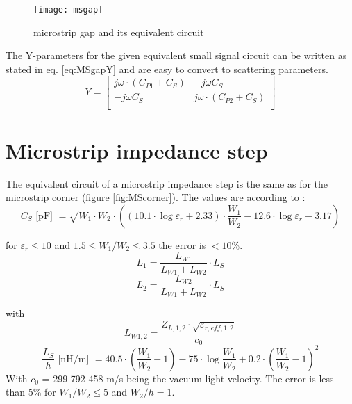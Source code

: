 \documentclass[10pt]{report}
\begin{document}
\begin{figure}[ht]
\begin{center}
\texttt{[image: msgap]}
\end{center}
\caption{microstrip gap and its equivalent circuit}
\label{fig:MSgap}
\end{figure}
\FloatBarrier

The Y-parameters for the given equivalent small signal circuit can be
written as stated in eq. \eqref{eq:MSgapY} and are easy to convert to
scattering parameters.
\begin{equation}
Y =
\begin{bmatrix}
j\omega\cdot \left(C_{P1} + C_S\right) & -j\omega C_S\\
-j\omega C_S & j\omega\cdot \left(C_{P2} + C_S\right)\\
\end{bmatrix}
\label{eq:MSgapY}
\end{equation}

\section{Microstrip impedance step}

The equivalent circuit of a microstrip impedance step is the same as
for the microstrip corner (figure \ref{fig:MScorner}).  The values are
according to \cite{Gupta}:
\begin{equation}
C_S \textrm{ [pF] } = \sqrt{W_1\cdot W_2}\cdot\left( (10.1\cdot\log{\varepsilon_r} + 2.33)\cdot
     \dfrac{W_1}{W_2} - 12.6\cdot\log{\varepsilon_r} - 3.17 \right)
\end{equation}

for $\varepsilon_r\le 10$ and $1.5\le W_1/W_2\le 3.5$ the error is
$<10$\%.
\begin{equation}
L_1 = \frac{L_{W1}}{L_{W1}+L_{W2}}\cdot L_S
\end{equation}
\begin{equation}
L_2 = \frac{L_{W2}}{L_{W1}+L_{W2}}\cdot L_S
\end{equation}

with
\begin{equation}
L_{W1,2} = \dfrac{Z_{L,1,2}\cdot\sqrt{\varepsilon_{r,eff,1,2}}}{c_0}
\end{equation}
\begin{equation}
\frac{L_S}{h} \textrm{ [nH/m] } = 40.5\cdot\left( \dfrac{W_1}{W_2}-1 \right)
      - 75\cdot\log{\dfrac{W_1}{W_2}} + 0.2\cdot \left( \dfrac{W_1}{W_2}-1 \right)^2
\end{equation}
With $c_0$ = 299 792 458 m/s being the vacuum light velocity.  The
error is less than 5\% for $W_1/W_2\le 5$ and $W_2/h = 1$.
\end{document}

